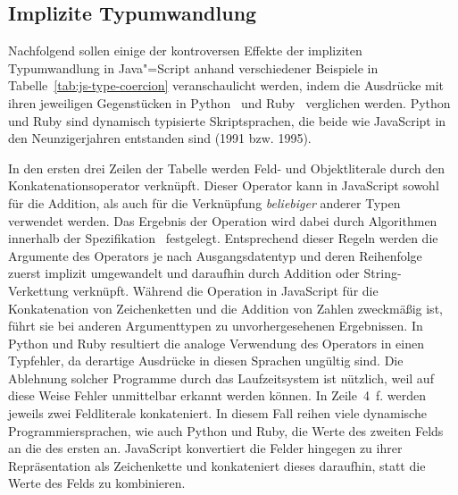 
\subsection{Implizite Typumwandlung}

Nachfolgend sollen einige der kontroversen Effekte der impliziten Typumwandlung in Java"=Script anhand verschiedener Beispiele in Tabelle~\ref{tab:js-type-coercion} veranschaulicht werden, indem die Ausdrücke mit ihren jeweiligen Gegenstücken in Python~\autocite{PYTHON3} und Ruby~\autocite{RUBY} verglichen werden. Python und Ruby sind dynamisch typisierte Skriptsprachen, die beide wie JavaScript in den Neunzigerjahren entstanden sind (1991 bzw. 1995).

In den ersten drei Zeilen der Tabelle werden Feld- und Objektliterale durch den Konkatenationsoperator \code{+} verknüpft. Dieser Operator kann in JavaScript sowohl für die Addition, als auch für die Verknüpfung \emph{beliebiger} anderer Typen verwendet werden. Das Ergebnis der Operation wird dabei durch Algorithmen innerhalb der Spezifikation~\autocite[220]{ECMASCRIPT:2019} festgelegt. Entsprechend dieser Regeln werden die Argumente des Operators je nach Ausgangsdatentyp und deren Reihenfolge zuerst implizit umgewandelt und daraufhin durch Addition oder String-Verkettung verknüpft. Während die Operation in JavaScript für die Konkatenation von Zeichenketten und die Addition von Zahlen zweckmäßig ist, führt sie bei anderen Argumenttypen zu unvorhergesehenen Ergebnissen. In Python und Ruby resultiert die analoge Verwendung des Operators in einen Typfehler, da derartige Ausdrücke in diesen Sprachen ungültig sind. Die Ablehnung solcher Programme durch das Laufzeitsystem ist nützlich, weil auf diese Weise Fehler unmittelbar erkannt werden können.
In Zeile~4~f. werden jeweils zwei Feldliterale konkateniert. In diesem Fall reihen viele dynamische Programmiersprachen, wie auch Python und Ruby, die Werte des zweiten Felds an die des ersten an. JavaScript konvertiert die Felder hingegen zu ihrer Repräsentation als Zeichenkette und konkateniert dieses daraufhin, statt die Werte des Felds zu kombinieren.


